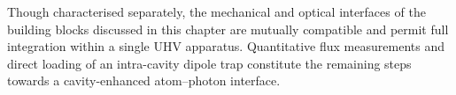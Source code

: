 \documentclass[../Thesis-IJspeert.tex]{subfiles}
\begin{document}
Though characterised separately, the mechanical and optical interfaces of the building blocks discussed in this chapter are mutually compatible and permit full integration within a single UHV apparatus. Quantitative flux measurements and direct loading of an intra-cavity dipole trap constitute the remaining steps towards a cavity-enhanced atom–photon interface.
\end{document}
